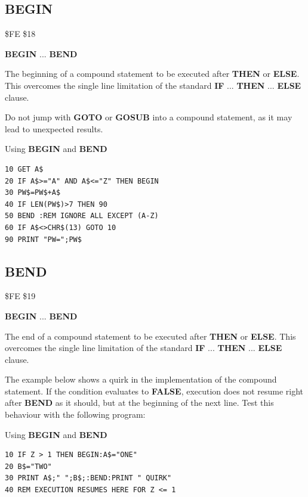\subsection{BEGIN}
\begin{description}[leftmargin=2cm,style=nextline]
\item [Token:] \$FE \$18
\item [Format:] {\bf BEGIN} ... {\bf BEND}
\item [Usage:] The beginning of a compound statement
               to be executed after {\bf THEN} or {\bf ELSE}.
               This overcomes the single line limitation of the
               standard {\bf IF} ... {\bf THEN} ... {\bf ELSE} clause.
\item [Remarks:] Do not jump with {\bf GOTO} or {\bf GOSUB} into a
                 compound statement, as it may lead to unexpected
                 results.
\item [Example:] Using {\bf BEGIN} and {\bf BEND}
\begin{tcolorbox}[colback=black,coltext=white]
\verbatimfont{\codefont}
\begin{verbatim}
10 GET A$
20 IF A$>="A" AND A$<="Z" THEN BEGIN
30 PW$=PW$+A$
40 IF LEN(PW$)>7 THEN 90
50 BEND :REM IGNORE ALL EXCEPT (A-Z)
60 IF A$<>CHR$(13) GOTO 10
90 PRINT "PW=";PW$
\end{verbatim}
\end{tcolorbox}
\end{description}


\newpage
\subsection{BEND}
\begin{description}[leftmargin=2cm,style=nextline]
\item [Token:] \$FE \$19
\item [Format:] {\bf BEGIN} ... {\bf BEND}
\item [Usage:] The end of a compound statement
               to be executed after {\bf THEN} or {\bf ELSE}.
               This overcomes the single line limitation of the
               standard {\bf IF} ... {\bf THEN} ... {\bf ELSE} clause.
\item [Remarks:] The example below shows a quirk in the implementation
                 of the compound statement.
                 If the condition evaluates to {\bf FALSE}, execution
                 does not resume right after {\bf BEND} as it should,
                 but at the beginning of the next line.
                 Test this behaviour with the following program:
\item [Example:] Using {\bf BEGIN} and {\bf BEND}
\begin{tcolorbox}[colback=black,coltext=white]
\verbatimfont{\codefont}
\begin{verbatim}
10 IF Z > 1 THEN BEGIN:A$="ONE"
20 B$="TWO"
30 PRINT A$;" ";B$;:BEND:PRINT " QUIRK"
40 REM EXECUTION RESUMES HERE FOR Z <= 1
\end{verbatim}
\end{tcolorbox}
\end{description}

